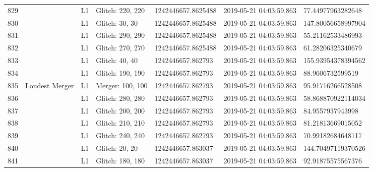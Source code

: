 \begin{longtable}{lllllll}
829  &                                                    &       L1 &  Glitch: 220, 220 &  1242446657.8625488 &  2019-05-21 04:03:59.863 &   77.44977963282648 \\
830  &                                                    &       L1 &    Glitch: 30, 30 &  1242446657.8625488 &  2019-05-21 04:03:59.863 &  147.80056658997904 \\
831  &                                                    &       L1 &  Glitch: 290, 290 &  1242446657.8625488 &  2019-05-21 04:03:59.863 &   55.21162533486993 \\
832  &                                                    &       L1 &  Glitch: 270, 270 &  1242446657.8625488 &  2019-05-21 04:03:59.863 &   61.28206325340679 \\
833  &                                                    &       L1 &    Glitch: 40, 40 &   1242446657.862793 &  2019-05-21 04:03:59.863 &  155.93954378394562 \\
834  &                                                    &       L1 &  Glitch: 190, 190 &   1242446657.862793 &  2019-05-21 04:03:59.863 &    88.9606732599519 \\
835  &                                     Loudest Merger &       L1 &  Merger: 100, 100 &   1242446657.862793 &  2019-05-21 04:03:59.863 &   95.91716266528508 \\
836  &                                                    &       L1 &  Glitch: 280, 280 &   1242446657.862793 &  2019-05-21 04:03:59.863 &  58.868870922114034 \\
837  &                                                    &       L1 &  Glitch: 200, 200 &   1242446657.862793 &  2019-05-21 04:03:59.863 &    84.9557937943998 \\
838  &                                                    &       L1 &  Glitch: 210, 210 &   1242446657.862793 &  2019-05-21 04:03:59.863 &   81.21813669015052 \\
839  &                                                    &       L1 &  Glitch: 240, 240 &   1242446657.862793 &  2019-05-21 04:03:59.863 &   70.99182684648117 \\
840  &                                                    &       L1 &    Glitch: 20, 20 &   1242446657.863037 &  2019-05-21 04:03:59.863 &  144.70497119370526 \\
841  &                                                    &       L1 &  Glitch: 180, 180 &   1242446657.863037 &  2019-05-21 04:03:59.863 &   92.91875575567376 \\

\end{longtable}
